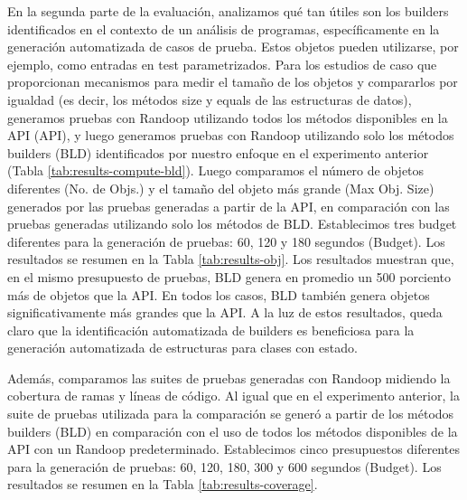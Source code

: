En la segunda parte de la evaluación, analizamos qué tan útiles son los builders identificados en el contexto de un análisis de programas, específicamente en la generación automatizada de casos de prueba. Estos objetos pueden utilizarse, por ejemplo, como entradas en test parametrizados. Para los estudios de caso que proporcionan mecanismos para medir el tamaño de los objetos y compararlos por igualdad (es decir, los métodos size y equals de las estructuras de datos), generamos pruebas con Randoop utilizando todos los métodos disponibles en la API (API), y luego generamos pruebas con Randoop utilizando solo los métodos builders (BLD) identificados por nuestro enfoque en el experimento anterior (Tabla \ref{tab:results-compute-bld}). Luego comparamos el número de objetos diferentes (No. de Objs.) y el tamaño del objeto más grande (Max Obj. Size) generados por las pruebas generadas a partir de la API, en comparación con las pruebas generadas utilizando solo los métodos de BLD. Establecimos tres budget diferentes para la generación de pruebas: 60, 120 y 180 segundos (Budget). Los resultados se resumen en la Tabla \ref{tab:results-obj}. Los resultados muestran que, en el mismo presupuesto de pruebas, BLD genera en promedio un 500 porciento más de objetos que la API. En todos los casos, BLD también genera objetos significativamente más grandes que la API. A la luz de estos resultados, queda claro que la identificación automatizada de builders es beneficiosa para la generación automatizada de estructuras para clases con estado.

Además, comparamos las suites de pruebas generadas con Randoop midiendo la cobertura de ramas y líneas de código. Al igual que en el experimento anterior, la suite de pruebas utilizada para la comparación se generó a partir de los métodos builders (BLD) en comparación con el uso de todos los métodos disponibles de la API con un Randoop predeterminado. Establecimos cinco presupuestos diferentes para la generación de pruebas: 60, 120, 180, 300 y 600 segundos (Budget). Los resultados se resumen en la Tabla \ref{tab:results-coverage}.

